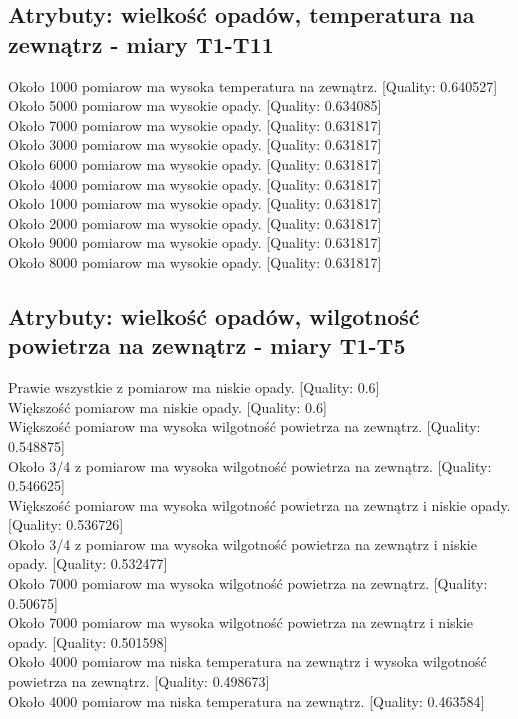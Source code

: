 \documentclass{classrep}
\begin{document}
\subsection{Atrybuty: wielkość opadów, temperatura na zewnątrz - miary T1-T11}
Około 1000 pomiarow ma wysoka temperatura na zewnątrz. [Quality: 0.640527]\\
Około 5000 pomiarow ma wysokie opady. [Quality: 0.634085]\\
Około 7000 pomiarow ma wysokie opady. [Quality: 0.631817]\\
Około 3000 pomiarow ma wysokie opady. [Quality: 0.631817]\\
Około 6000 pomiarow ma wysokie opady. [Quality: 0.631817]\\
Około 4000 pomiarow ma wysokie opady. [Quality: 0.631817]\\
Około 1000 pomiarow ma wysokie opady. [Quality: 0.631817]\\
Około 2000 pomiarow ma wysokie opady. [Quality: 0.631817]\\
Około 9000 pomiarow ma wysokie opady. [Quality: 0.631817]\\
Około 8000 pomiarow ma wysokie opady. [Quality: 0.631817]\\

\subsection{Atrybuty: wielkość opadów, wilgotność powietrza na zewnątrz - miary T1-T5}
Prawie wszystkie z pomiarow ma niskie opady. [Quality: 0.6]\\
Większość pomiarow ma niskie opady. [Quality: 0.6]\\
Większość pomiarow ma wysoka wilgotność powietrza na zewnątrz. [Quality: 0.548875]\\
Około 3/4 z pomiarow ma wysoka wilgotność powietrza na zewnątrz. [Quality: 0.546625]\\
Większość pomiarow ma wysoka wilgotność powietrza na zewnątrz i niskie opady. [Quality: 0.536726]\\
Około 3/4 z pomiarow ma wysoka wilgotność powietrza na zewnątrz i niskie opady. [Quality: 0.532477]\\
Około 7000 pomiarow ma wysoka wilgotność powietrza na zewnątrz. [Quality: 0.50675]\\
Około 7000 pomiarow ma wysoka wilgotność powietrza na zewnątrz i niskie opady. [Quality: 0.501598]\\
Około 4000 pomiarow ma niska temperatura na zewnątrz i wysoka wilgotność powietrza na zewnątrz. [Quality: 0.498673]\\
Około 4000 pomiarow ma niska temperatura na zewnątrz. [Quality: 0.463584]\\
\end{document}
